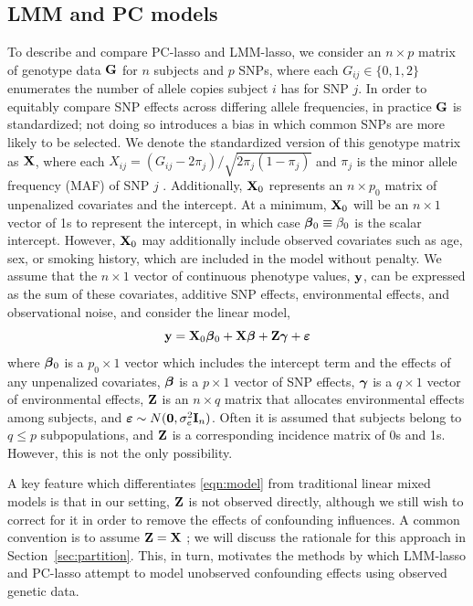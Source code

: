 \subsection{LMM and PC models}
\label{Sec:lmm-and-pc}

To describe and compare PC-lasso and LMM-lasso, we consider an $n \times p$ matrix of genotype data $\mathbf{G}$ for $n$ subjects and $p$ SNPs, where each $G_{ij} \in \{ 0, 1, 2 \}$ enumerates the number of allele copies subject $i$ has for SNP $j$. In order to equitably compare SNP effects across differing allele frequencies, in practice $\mathbf{G}$ is standardized; not doing so introduces a bias in which common SNPs are more likely to be selected. We denote the standardized version of this genotype matrix as $\mathbf{X}$, where each $X_{ij} = (G_{ij} - 2 \pi_j) / \sqrt{2\pi_j (1 - \pi_j)}$ and $\pi_j$ is the minor allele frequency (MAF) of SNP $j$ \citep{zhang2015principal, price2006principal}. Additionally, $\mathbf{X}_0$ represents an $n \times p_0$ matrix of unpenalized covariates and the intercept. At a minimum, $\mathbf{X}_0$ will be an $n \times 1$ vector of 1s to represent the intercept, in which case $\boldsymbol{\beta}{}_0 \equiv \beta_0$ is the scalar intercept. However, $\mathbf{X}_0$ may additionally include observed covariates such as age, sex, or smoking history, which are included in the model without penalty. We assume that the $n \times 1$ vector of continuous phenotype values, $\mathbf{y}$, can be expressed as the sum of these covariates, additive SNP effects, environmental effects, and observational noise, and consider the linear model,
\begin{equation}
    \label{eqn:model}
    \mathbf{y} = \mathbf{X}_0 \boldsymbol{\beta}{}_0 + \mathbf{X}\boldsymbol{\beta}{} + \mathbf{Z}\boldsymbol{\gamma} + \boldsymbol{\varepsilon}{}
\end{equation}
where $\boldsymbol{\beta}{}_0$ is a $p_0 \times 1$ vector which includes the intercept term and the effects of any unpenalized covariates, $\boldsymbol{\beta}{}$ is a $p \times 1$ vector of SNP effects, $\boldsymbol{\gamma}$ is a $q \times 1$ vector of environmental effects, $\mathbf{Z}$ is an $n \times q$ matrix that allocates environmental effects among subjects, and $\boldsymbol{\varepsilon}{} \sim N(\boldsymbol{0}, \sigma^2_e \mathbf{I}_n)$. Often it is assumed that subjects belong to $q \le p$ subpopulations, and $\mathbf{Z}$ is a corresponding incidence matrix of 0s and 1s. However, this is not the only possibility.

A key feature which differentiates \eqref{eqn:model} from traditional linear mixed models is that in our setting, $\mathbf{Z}$ is not observed directly, although we still wish to correct for it in order to remove the effects of confounding influences. A common convention is to assume $\mathbf{Z} = \mathbf{X}$ \citep{wang2018multiplex, lippert2011fast, yang2014advantages}; we will discuss the rationale for this approach in Section~\ref{sec:partition}.  This, in turn, motivates the methods by which LMM-lasso and PC-lasso attempt to model unobserved confounding effects using observed genetic data.

